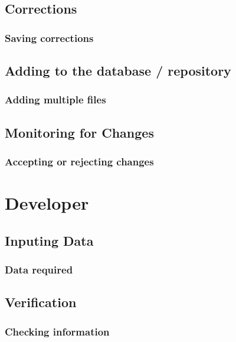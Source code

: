 \documentclass[a4paper,12pt]{article}
\begin{document}
   \subsection{Corrections}
      
      \subsubsection{Saving corrections}

    \subsection{Adding to the database / repository}
      
      \subsubsection{Adding multiple files}

    \subsection{Monitoring for Changes}

      \subsubsection{Accepting or rejecting changes}
\pagebreak

\section{\bf Developer}

  \subsection{Inputing Data}

     \subsubsection{Data required}
  
   \subsection{Verification}

      \subsubsection{Checking information}
      
\end{document}
